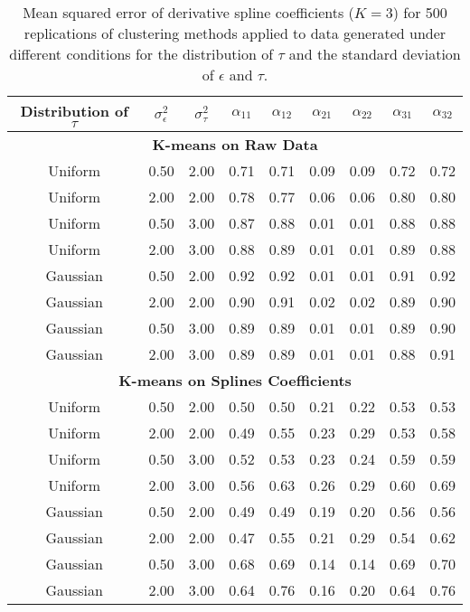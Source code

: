 \documentclass[12pt]{article}
\begin{document}
\begin{table}[ht]
\begin{center}
\begin{tabular}{ccc|cccccc}
  \hline Distribution of $\tau$&$\sigma_{\epsilon}^2$&$\sigma_{\tau}^2$&$\alpha_{11}$&$\alpha_{12}$&$\alpha_{21}$&$\alpha_{22}$&$\alpha_{31}$&$\alpha_{32}$\\ \hline\multicolumn{9}{c}{\textbf{K-means on Raw Data}}\\ Uniform & 0.50 & 2.00 & 0.71 & 0.71 & 0.09 & 0.09 & 0.72 & 0.72 \\ 
  Uniform & 2.00 & 2.00 & 0.78 & 0.77 & 0.06 & 0.06 & 0.80 & 0.80 \\ 
  Uniform & 0.50 & 3.00 & 0.87 & 0.88 & 0.01 & 0.01 & 0.88 & 0.88 \\ 
  Uniform & 2.00 & 3.00 & 0.88 & 0.89 & 0.01 & 0.01 & 0.89 & 0.88 \\ 
  Gaussian & 0.50 & 2.00 & 0.92 & 0.92 & 0.01 & 0.01 & 0.91 & 0.92 \\ 
  Gaussian & 2.00 & 2.00 & 0.90 & 0.91 & 0.02 & 0.02 & 0.89 & 0.90 \\ 
  Gaussian & 0.50 & 3.00 & 0.89 & 0.89 & 0.01 & 0.01 & 0.89 & 0.90 \\ 
  Gaussian & 2.00 & 3.00 & 0.89 & 0.89 & 0.01 & 0.01 & 0.88 & 0.91 \\ 
   \multicolumn{9}{c}{\textbf{K-means on Splines Coefficients}}\\Uniform & 0.50 & 2.00 & 0.50 & 0.50 & 0.21 & 0.22 & 0.53 & 0.53 \\ 
  Uniform & 2.00 & 2.00 & 0.49 & 0.55 & 0.23 & 0.29 & 0.53 & 0.58 \\ 
  Uniform & 0.50 & 3.00 & 0.52 & 0.53 & 0.23 & 0.24 & 0.59 & 0.59 \\ 
  Uniform & 2.00 & 3.00 & 0.56 & 0.63 & 0.26 & 0.29 & 0.60 & 0.69 \\ 
  Gaussian & 0.50 & 2.00 & 0.49 & 0.49 & 0.19 & 0.20 & 0.56 & 0.56 \\ 
  Gaussian & 2.00 & 2.00 & 0.47 & 0.55 & 0.21 & 0.29 & 0.54 & 0.62 \\ 
  Gaussian & 0.50 & 3.00 & 0.68 & 0.69 & 0.14 & 0.14 & 0.69 & 0.70 \\ 
  Gaussian & 2.00 & 3.00 & 0.64 & 0.76 & 0.16 & 0.20 & 0.64 & 0.76 \\ 
   \hline\end{tabular}
\caption{Mean squared error of derivative spline coefficients ($K=3$) for 500 replications of clustering methods applied to data generated under different conditions for the distribution of $\tau$ and the standard deviation of $\epsilon$ and $\tau$.}
\label{fig:se}
\end{center}
\end{table}
\end{document}
